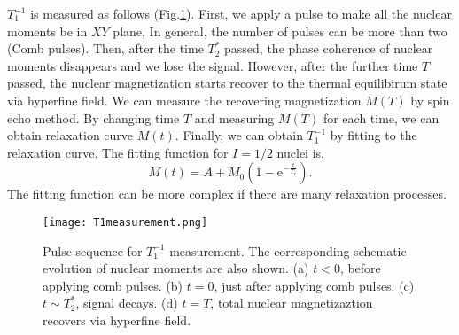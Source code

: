 $T^{-1}_1$ is measured as follows (Fig.\ref{T1measurement}).
First, we apply a pulse to make all the nuclear moments be in $XY$ plane,
In general, the number of pulses can be more than two (Comb pulses).
Then, after the time $T^*_2$ passed, the phase coherence of nuclear moments disappears and we lose the signal.
However, after the further time $T$ passed, the nuclear magnetization starts recover to the thermal equilibirum state via hyperfine field.
We can measure the recovering magnetization $M(T)$ by spin echo method.
By changing time $T$ and measuring $M(T)$ for each time, we can obtain relaxation curve $M(t)$.
Finally, we can obtain $T^{-1}_1$ by fitting to the relaxation curve.
The fitting function for $I = 1/2$ nuclei is,
\begin{equation}
M (t) = A + M_0 (1 - \mathrm{e}^{-\frac{t}{T_1}}).
\end{equation}
The fitting function can be more complex if there are many relaxation processes.

\begin{figure}
  \centering
  \texttt{[image: T1measurement.png]}
  \caption{Pulse sequence for $T^{-1}_1$ measurement.
  The corresponding schematic evolution of nuclear moments are also shown.
  (a) $t < 0$, before applying comb pulses.
  (b) $t = 0$, just after applying comb pulses.
  (c) $t\sim T^*_2$, signal decays.
  (d) $t = T$, total nuclear magnetizaztion recovers via hyperfine field.}
  \label{T1measurement}
\end{figure}

